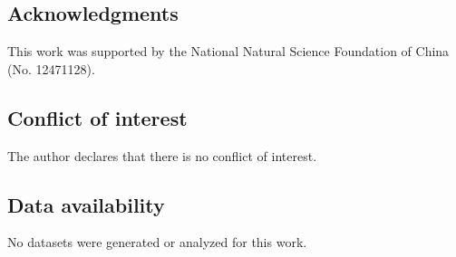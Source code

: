 \documentclass[11pt,reqno]{amsart}
\numberwithin{equation}{section}
\theoremstyle{remark}
\begin{document}
\subsection*{Acknowledgments}
This work was supported by the National Natural Science Foundation of China (No. 12471128).

\subsection*{Conflict of interest}
The author declares that there is no conflict of interest.

\subsection*{Data availability}
No datasets were generated or analyzed for this work.
\end{document}

